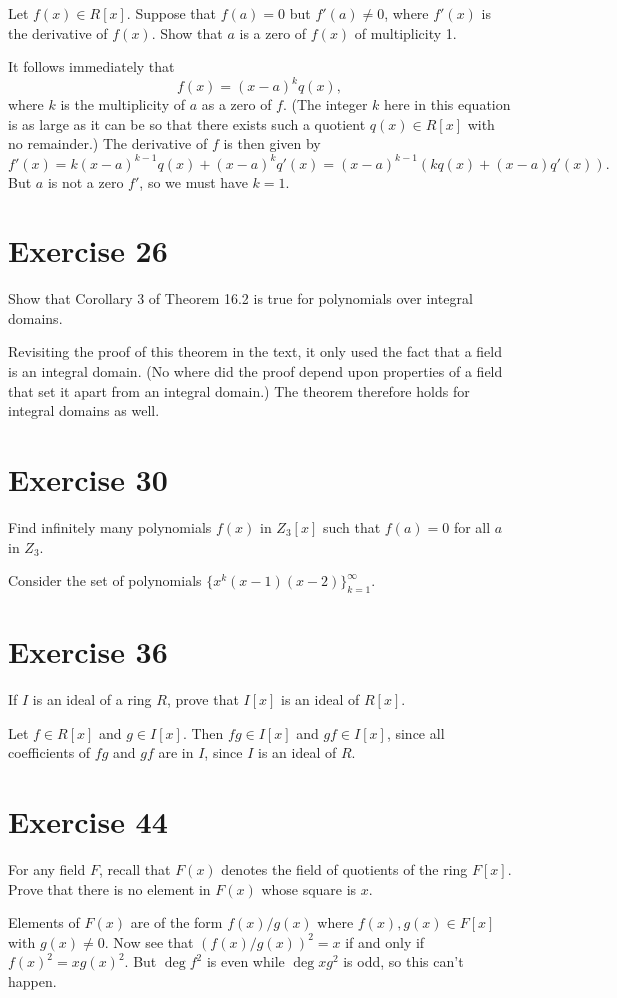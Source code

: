 \documentclass[12pt]{article}
\begin{document}
Let $f(x)\in R[x]$.  Suppose that $f(a)=0$ but $f'(a)\neq 0$,
where $f'(x)$ is the derivative of $f(x)$.  Show that $a$ is
a zero of $f(x)$ of multiplicity 1.

It follows immediately that
\begin{equation*}
f(x)=(x-a)^kq(x),
\end{equation*}
where $k$ is the multiplicity of $a$ as a zero of $f$.
(The integer $k$ here in this equation is as large as it
can be so that there exists such a quotient $q(x)\in R[x]$
with no remainder.)  The derivative of $f$ is then given by
\begin{equation*}
f'(x) = k(x-a)^{k-1}q(x)+(x-a)^kq'(x)=(x-a)^{k-1}(kq(x)+(x-a)q'(x)).
\end{equation*}
But $a$ is not a zero $f'$, so we must have $k=1$.

\section*{Exercise 26}

Show that Corollary 3 of Theorem 16.2 is true for polynomials
over integral domains.

Revisiting the proof of this theorem in the text, it only used
the fact that a field is an integral domain.  (No where did the
proof depend upon properties of a field that set it apart from
an integral domain.)  The theorem therefore
holds for integral domains as well.

\section*{Exercise 30}

Find infinitely many polynomials $f(x)$ in $Z_3[x]$ such
that $f(a)=0$ for all $a$ in $Z_3$.

Consider the set of polynomials $\{x^k(x-1)(x-2)\}_{k=1}^\infty$.

\section*{Exercise 36}

If $I$ is an ideal of a ring $R$, prove that $I[x]$ is an ideal of $R[x]$.

Let $f\in R[x]$ and $g\in I[x]$.  Then $fg\in I[x]$ and $gf\in I[x]$, since
all coefficients of $fg$ and $gf$ are in $I$, since $I$ is an ideal of $R$.

\section*{Exercise 44}

For any field $F$, recall that $F(x)$ denotes the field of quotients of the
ring $F[x]$.  Prove that there is no element in $F(x)$ whose square is $x$.

Elements of $F(x)$ are of the form $f(x)/g(x)$ where $f(x),g(x)\in F[x]$
with $g(x)\neq 0$.  Now see that $(f(x)/g(x))^2=x$ if and only if
$f(x)^2=xg(x)^2$.  But $\deg f^2$ is even while $\deg xg^2$ is
odd, so this can't happen.
\end{document}
